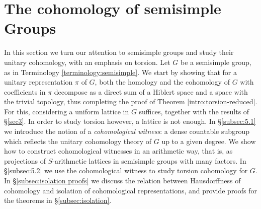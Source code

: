 \documentclass[12pt,reqno]{amsart}
\theoremstyle{definition}
\begin{document}
\section{The cohomology of semisimple Groups}\label{sec5}
In this section we turn our attention to semisimple groups and study their unitary cohomology, with an emphasis on torsion. Let $G$ be a semisimple group, as in Terminology \ref{terminology:semisimple}. We start by showing that for a unitary representation $\pi$ of $G$, both the homology and the cohomology of $G$ with coefficients in $\pi$ decompose as a direct sum of a Hiblert space and a space with the trivial topology, thus completing the proof of Theorem \ref{intro:torsion-reduced}. For this, considering a uniform lattice in $G$ suffices, together with the results of 
\S\ref{sec3}. In order to study torsion however, a lattice is not enough. In \S\ref{subsec:5.1} we introduce the notion of a \textit{cohomological witness}: a dense countable subgroup which reflects the unitary cohomology theory of $G$ up to a given degree. We show how to construct cohomological witnesses in an arithmetic way, that is, as projections of $S$-arithmetic lattices in semisimple groups with many factors. In \S\ref{subsec:5.2} we use the cohomological witness to study torsion cohomology for $G$. In \S\ref{subsec:isolation proofs} we discuss the relation between Hausdorffness of cohomology and isolation of cohomological representations, and provide proofs for the theorems in \S\ref{subsec:isolation}.
\end{document}
